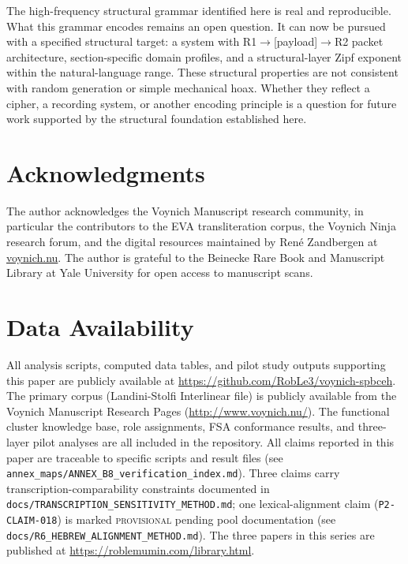 \documentclass[11pt,a4paper,twocolumn]{article}
\begin{document}
The high-frequency structural grammar identified here is real and reproducible. What this grammar encodes remains an open question. It can now be pursued with a specified structural target: a system with R1$\to$[payload]$\to$R2 packet architecture, section-specific domain profiles, and a structural-layer Zipf exponent within the natural-language range. These structural properties are not consistent with random generation or simple mechanical hoax. Whether they reflect a cipher, a recording system, or another encoding principle is a question for future work supported by the structural foundation established here.

\section*{Acknowledgments}

The author acknowledges the Voynich Manuscript research community, in particular the contributors to the EVA transliteration corpus, the Voynich Ninja research forum, and the digital resources maintained by Ren\'e Zandbergen at \url{voynich.nu}. The author is grateful to the Beinecke Rare Book and Manuscript Library at Yale University for open access to manuscript scans.

\section*{Data Availability}

All analysis scripts, computed data tables, and pilot study outputs supporting this paper are publicly available at \url{https://github.com/RobLe3/voynich-spbceh}. The primary corpus (Landini-Stolfi Interlinear file) is publicly available from the Voynich Manuscript Research Pages (\url{http://www.voynich.nu/}). The functional cluster knowledge base, role assignments, FSA conformance results, and three-layer pilot analyses are all included in the repository. All claims reported in this paper are traceable to specific scripts and result files (see \texttt{annex\_maps/ANNEX\_B8\_verification\_index.md}). Three claims carry transcription-comparability constraints documented in \texttt{docs/TRANSCRIPTION\_SENSITIVITY\_METHOD.md}; one lexical-alignment claim (\texttt{P2-CLAIM-018}) is marked \textsc{provisional} pending pool documentation (see \texttt{docs/R6\_HEBREW\_ALIGNMENT\_METHOD.md}). The three papers in this series are published at \url{https://roblemumin.com/library.html}.
\end{document}
